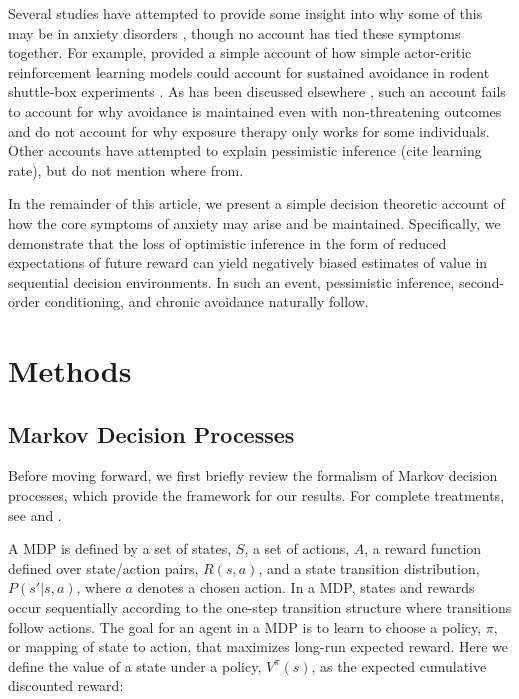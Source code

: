 \documentclass[11pt]{article} %
\begin{document}
Several studies have attempted to provide some insight into why some of this
may be in anxiety disorders \cite{Maia2010, norbury2018}, though no account has
tied these symptoms together. For example, \citep{Maia2010} provided a simple
account of how simple actor-critic reinforcement learning models could account
for sustained avoidance in rodent shuttle-box experiments \citep{servatius2008}.
As has been discussed elsewhere \citep{Moutoussis2017}, such an account fails to account for why avoidance
is maintained even with non-threatening outcomes and do not account for why exposure
therapy only works for some individuals. Other accounts have attempted to explain
pessimistic inference (cite learning rate), but do not mention where from.

In the remainder of this article, we present a simple decision theoretic account
of how the core symptoms of anxiety may arise and be maintained. Specifically, we
demonstrate that the loss of optimistic inference in the form of reduced expectations
of future reward can yield negatively biased estimates of value in sequential
decision environments. In such an event, pessimistic inference, second-order
conditioning, and chronic avoidance naturally follow.

\section{Methods}

\subsection{Markov Decision Processes}

Before moving forward, we first briefly review the formalism of Markov decision
processes, which provide the framework for our results. For complete treatments,
see \cite{SuttonBarto1998, SuttonBarto2018} and \cite{bertsekas2005}.

A MDP is defined by a set of states, $S$, a set of actions, $A$, a reward
function defined over state/action pairs, $R(s,a)$, and a state transition distribution,
$P(s'|s,a)$, where $a$ denotes a chosen action. In a MDP, states and rewards occur
sequentially according to the one-step transition structure where transitions follow
actions. The goal for an agent in a MDP is to learn to choose a policy, $\pi$, or
mapping of state to action, that maximizes long-run expected reward. Here we define
the value of a state under a policy, $V^\pi(s)$, as the expected cumulative discounted reward:
\end{document}
